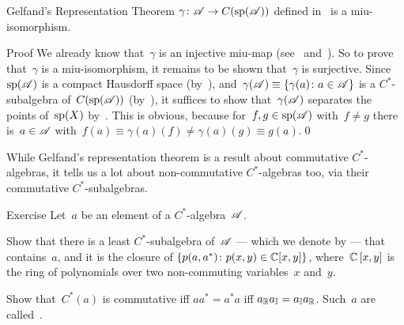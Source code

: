 \documentclass[a]{subfiles}
\begin{document}
\begin{parsec}
\begin{point}[gelfand]{Gelfand's Representation Theorem}
 $\gamma\colon \mathscr{A}\to C(\mathrm{sp}(\mathscr{A}))$
defined in~
is a miu-isomorphism.
\begin{point}{Proof}%
We already know that~$\gamma$ is an injective miu-map
(see~ 
and~).
So to prove that~$\gamma$ is a miu-isomorphism,
it remains to be shown that~$\gamma$ is surjective.
Since~$\mathrm{sp}(\mathscr{A})$ is a compact Hausdorff space 
(by~),
and~$\gamma(\mathscr{A})\equiv \{\gamma(a)\colon a\in \mathscr{A}\}$
is a $C^*$-subalgebra of~$C(\mathrm{sp}(\mathscr{A}))$
(by~),
it suffices to show that~$\gamma(\mathscr{A})$
separates the points of~$\mathrm{sp}(X)$
by~.
This is obvious,
because
for~$f,g\in \mathrm{sp}(\mathscr{A})$ with~$f\neq g$
there is~$a\in \mathscr{A}$ with~$f(a)\equiv \gamma(a)(f)
\neq \gamma(a)(g)\equiv g(a)$.\qed
\end{point}
\end{point}
\end{parsec}
\begin{parsec}%
\begin{point}%
While Gelfand's representation theorem
is a result about commutative $C^*$-algebras,
it tells us a lot about non-commutative $C^*$-algebras too,
via their commutative $C^*$-subalgebras.
\end{point}
\begin{point}{Exercise}%
Let~$a$ be an element of a $C^*$-algebra~$\mathscr{A}$.

Show that there is a least $C^*$-subalgebra of~$\mathscr{A}$
--- which we denote by  --- 
that contains~$a$,
and it is the closure of $\{p(a,a^*)\colon p(x,y)\in \mathbb{C}[x,y]\}$,
where~$\mathbb{C}\left[x,y\right]$ is the
ring of polynomials over two non-commuting
variables~$x$ and~$y$.

Show that~$C^*(a)$ is commutative
iff $aa^*=a^*a$ iff $a_{\mathbb{R}}a_{\mathbb{I}}=a_{\mathbb{I}}a_{\mathbb{R}}$.
Such~$a$ are called~.

\end{point}
\end{parsec}
\end{document}
